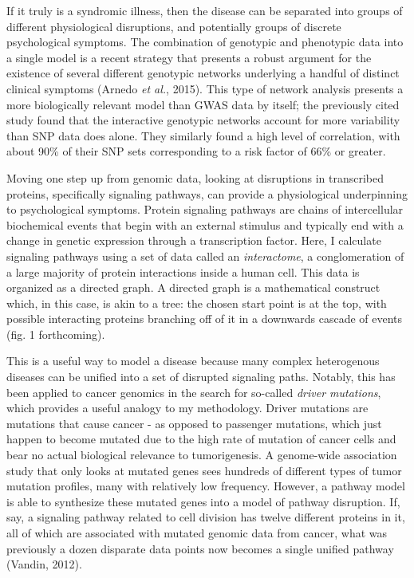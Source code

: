 \documentclass[12pt,twoside]{reedthesis}
\begin{document}
	If it truly is a syndromic illness, then the disease can be separated into groups of different physiological disruptions, and potentially groups of discrete psychological symptoms. The combination of genotypic and phenotypic data into a single model is a recent strategy that presents a robust argument for the existence of several different genotypic networks underlying a handful of distinct clinical symptoms (Arnedo \textit{et al.}, 2015). This type of network analysis presents a more biologically relevant model than GWAS data by itself; the previously cited study found that the interactive genotypic networks account for more variability than SNP data does alone. They similarly found a high level of correlation, with about 90\% of their SNP sets corresponding to a risk factor of 66\% or greater. %
	
	Moving one step up from genomic data, looking at disruptions in transcribed proteins, specifically signaling pathways, can provide a physiological underpinning to psychological symptoms. Protein signaling pathways are chains of intercellular biochemical events that begin with an external stimulus and typically end with a change in genetic expression through a transcription factor. Here, I calculate signaling pathways using a set of data called an \textit{interactome}, a conglomeration of a large majority of protein interactions inside a human cell. This data is organized as a directed graph. A directed graph is a mathematical construct which, in this case, is akin to a tree: the chosen start point is at the top, with possible interacting proteins branching off of it in a downwards cascade of events (fig. 1 forthcoming). 

This is a useful way to model a disease because many complex heterogenous diseases can be unified into a set of disrupted signaling paths. Notably, this has been applied to cancer genomics in the search for so-called \textit{driver mutations}, which provides a useful analogy to my methodology. Driver mutations are mutations that cause cancer - as opposed to passenger mutations, which just happen to become mutated due to the high rate of mutation of cancer cells and bear no actual biological relevance to tumorigenesis. A genome-wide association study that only looks at mutated genes sees hundreds of different types of tumor mutation profiles, many with relatively low frequency. However, a pathway model is able to synthesize these mutated genes into a model of pathway disruption. If, say, a signaling pathway related to cell division has twelve different proteins in it, all of which are associated with mutated genomic data from cancer, what was previously a dozen disparate data points now becomes a single unified pathway (Vandin, 2012). 
\end{document}
